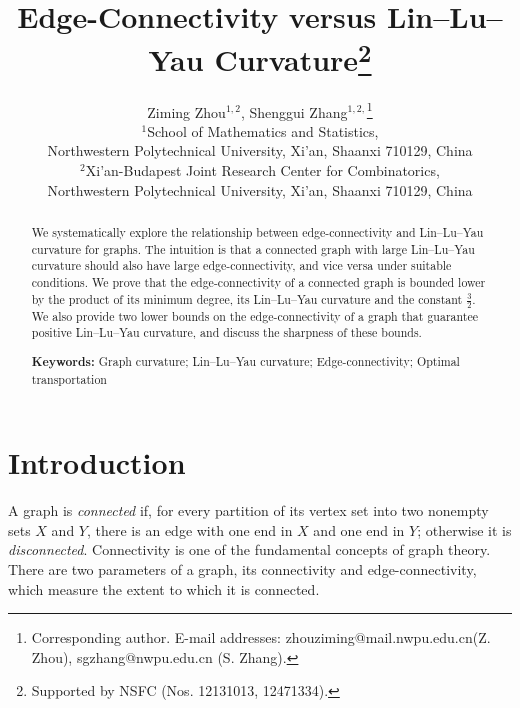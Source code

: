 \documentclass[11pt,bezier]{article}
\theoremstyle{definition}
\theoremstyle{definition}
\theoremstyle{nonumber}
\begin{document}
\title{\bf\Large Edge-Connectivity versus Lin--Lu--Yau Curvature\thanks{Supported by NSFC (Nos. 12131013, 12471334).}}

\date{}

\author{Ziming Zhou$^{1,2}$, Shenggui Zhang$^{1,2,}$\thanks{Corresponding author. E-mail addresses: zhouziming@mail.nwpu.edu.cn(Z. Zhou), sgzhang@nwpu.edu.cn (S. Zhang).}\\
\small $^{1}$School of Mathematics and Statistics, \\
\small Northwestern Polytechnical University, Xi'an, Shaanxi 710129, China\\
\small $^{2}$Xi'an-Budapest Joint Research Center for Combinatorics, \\
\small Northwestern Polytechnical University, Xi'an, Shaanxi 710129, China\\}



\maketitle

\begin{abstract}
We systematically explore the relationship between edge-connectivity and Lin--Lu--Yau curvature for graphs. 
The intuition is that a connected graph with large Lin--Lu--Yau curvature should also have large edge-connectivity, and vice versa under suitable conditions. 
We prove that the edge-connectivity of a connected graph is bounded lower by the product of its minimum degree, its Lin--Lu--Yau curvature and the constant $\frac{3}{2}$. 
We also provide two lower bounds on the edge-connectivity of a graph that guarantee positive Lin--Lu--Yau curvature, 
and discuss the sharpness of these bounds.
  
\medskip

\begin{flushleft}
\textbf{Keywords:}    Graph curvature; Lin--Lu--Yau curvature; Edge-connectivity; Optimal transportation
\end{flushleft}

\end{abstract}

\section{Introduction}

A graph is \textit{connected} if, for every partition of its vertex set into two nonempty sets $X$ and $Y$, there is an edge with one end in $X$ and one end in $Y$; otherwise it is \textit{disconnected}.
Connectivity is one of the fundamental concepts of graph theory.
There are two parameters of a graph, its connectivity and edge-connectivity, which measure the extent to which it is connected\cite{Bondy2008, Diestel2017}.
\end{document}
